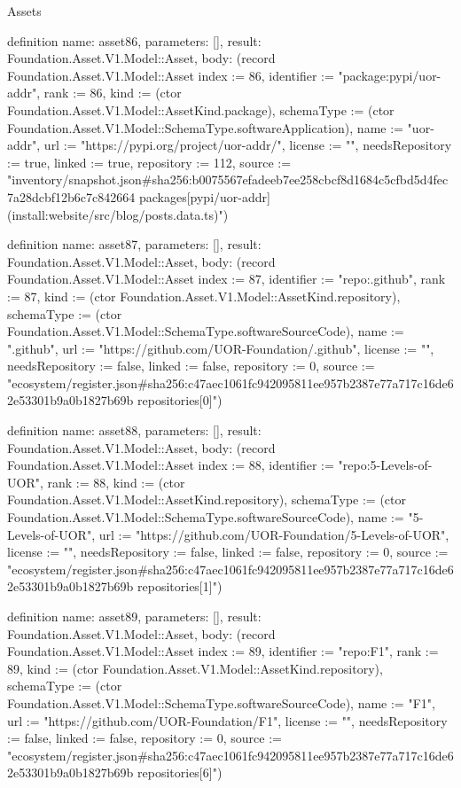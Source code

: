 \begin{lexlean}{Assets}
\begin{semanticmodule}
definition{
  name: asset86,
  parameters: [],
  result: Foundation.Asset.V1.Model::Asset,
  body: (record Foundation.Asset.V1.Model::Asset {index := 86, identifier := "package:pypi/uor-addr", rank := 86, kind := (ctor Foundation.Asset.V1.Model::AssetKind.package), schemaType := (ctor Foundation.Asset.V1.Model::SchemaType.softwareApplication), name := "uor-addr", url := "https://pypi.org/project/uor-addr/", license := "", needsRepository := true, linked := true, repository := 112, source := "inventory/snapshot.json#sha256:b0075567efadeeb7ee258cbcf8d1684c5cfbd5d4fec7a28dcbf12b6c7c842664 packages[pypi/uor-addr] (install:website/src/blog/posts.data.ts)"})
}

definition{
  name: asset87,
  parameters: [],
  result: Foundation.Asset.V1.Model::Asset,
  body: (record Foundation.Asset.V1.Model::Asset {index := 87, identifier := "repo:.github", rank := 87, kind := (ctor Foundation.Asset.V1.Model::AssetKind.repository), schemaType := (ctor Foundation.Asset.V1.Model::SchemaType.softwareSourceCode), name := ".github", url := "https://github.com/UOR-Foundation/.github", license := "", needsRepository := false, linked := false, repository := 0, source := "ecosystem/register.json#sha256:c47aec1061fc942095811ee957b2387e77a717c16de62e53301b9a0b1827b69b repositories[0]"})
}

definition{
  name: asset88,
  parameters: [],
  result: Foundation.Asset.V1.Model::Asset,
  body: (record Foundation.Asset.V1.Model::Asset {index := 88, identifier := "repo:5-Levels-of-UOR", rank := 88, kind := (ctor Foundation.Asset.V1.Model::AssetKind.repository), schemaType := (ctor Foundation.Asset.V1.Model::SchemaType.softwareSourceCode), name := "5-Levels-of-UOR", url := "https://github.com/UOR-Foundation/5-Levels-of-UOR", license := "", needsRepository := false, linked := false, repository := 0, source := "ecosystem/register.json#sha256:c47aec1061fc942095811ee957b2387e77a717c16de62e53301b9a0b1827b69b repositories[1]"})
}

definition{
  name: asset89,
  parameters: [],
  result: Foundation.Asset.V1.Model::Asset,
  body: (record Foundation.Asset.V1.Model::Asset {index := 89, identifier := "repo:F1", rank := 89, kind := (ctor Foundation.Asset.V1.Model::AssetKind.repository), schemaType := (ctor Foundation.Asset.V1.Model::SchemaType.softwareSourceCode), name := "F1", url := "https://github.com/UOR-Foundation/F1", license := "", needsRepository := false, linked := false, repository := 0, source := "ecosystem/register.json#sha256:c47aec1061fc942095811ee957b2387e77a717c16de62e53301b9a0b1827b69b repositories[6]"})
}


\end{semanticmodule}
\end{lexlean}
